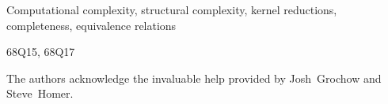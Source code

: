 \begin{keywords}
  Computational complexity, structural complexity, kernel reductions, completeness, equivalence relations
\end{keywords}

\begin{subject}
  68Q15, 68Q17
\end{subject}













\begin{acknowledge}
  The authors acknowledge the invaluable help provided by Josh~Grochow and Steve~Homer.
\end{acknowledge}





